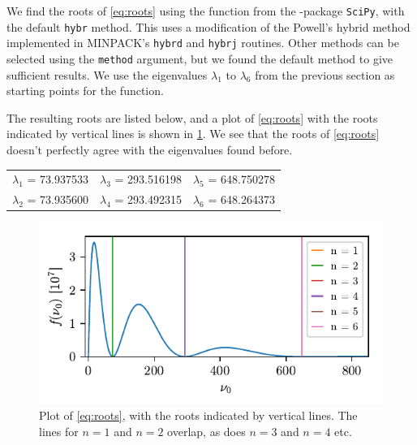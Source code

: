 We find the roots of \cref{eq:roots} using the function  from the \python-package \texttt{SciPy}, with the default \verb!hybr! method. This uses a modification of the Powell's hybrid method\cite{powell1970hybrid} implemented in MINPACK’s \verb!hybrd! and \verb!hybrj! routines. Other methods can be selected using the \verb!method! argument, but we found the default method to give sufficient results. We use the eigenvalues $\lambda_1$ to $\lambda_6$ from the previous section as starting points for the function. 

The resulting roots are listed below, and a plot of \cref{eq:roots} with the roots indicated by vertical lines is shown in \cref{fig:roots}. We see that the roots of \cref{eq:roots} doesn't perfectly agree with the eigenvalues found before.

\begin{center}
\begin{tabular}{ccc}
$\lambda_1$ = 73.937533 &$\lambda_3$ = 293.516198 &$\lambda_5$ = 648.750278 \\
$\lambda_2$ = 73.935600 &$\lambda_4$ = 293.492315 &$\lambda_6$ = 648.264373
\end{tabular}
\end{center}

\begin{figure}[ht!]%
\centering%
\includegraphics{figs/roots_with_roots.pdf}%
\caption{Plot of \cref{eq:roots}, with the roots indicated by vertical lines. The lines for $n=1$ and $n=2$ overlap, as does $n=3$ and $n=4$ etc. \label{fig:roots}}%
\end{figure}

